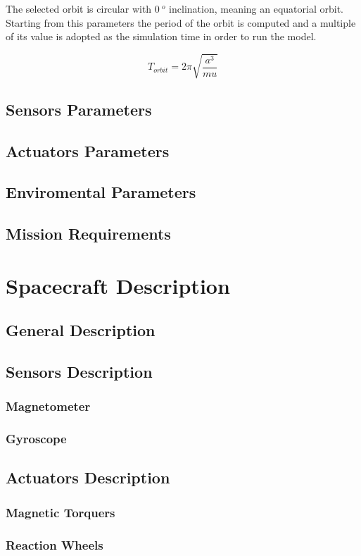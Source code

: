 \documentclass[11pt,a4paper]{report}
\begin{document}
The selected orbit is circular with $0\ ^{o}$ inclination, meaning an equatorial orbit. Starting from this parameters the period of the orbit is computed and a multiple of its value is adopted as the simulation time in order to run the model.

$$T_{orbit} = 2\pi\sqrt{\frac{a^{3}}{mu}}$$

\section{Sensors Parameters}
\section{Actuators Parameters}
\section{Enviromental Parameters}
\section{Mission Requirements}

\chapter{Spacecraft Description}

\section{General Description}
\section{Sensors Description}
\subsection{Magnetometer}
\subsection{Gyroscope}
\section{Actuators Description}
\subsection{Magnetic Torquers}
\subsection{Reaction Wheels}
\end{document}
